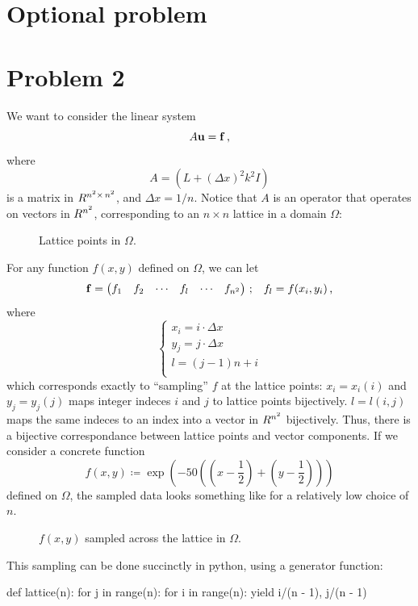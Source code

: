 \documentclass[12pt]{article}
\begin{document}
\begin{multicols}{2}
    \section*{Optional problem}



    \section*{Problem 2}
    We want to consider the linear system
    \[
        A \vec u = \vec f \,\text,
    \]
    where
    \[
        A = \left(
            L + (\Delta x)^2 k^2 I
        \right)
    \]
    is a matrix in $\R^{{n^2} \times\, {n^2}}$,
    and $\Delta x = 1/n$. Notice that $A$ is an operator
    that operates on vectors in $\R^{n^2}$, corresponding to
    an $n \times n$ lattice in a domain $\Omega$:

    \begin{figure}[H]
        \centering
        
        \caption{
            Lattice points in $\Omega$.
        }
        \label{fig:omega}
    \end{figure}\noindent
    For any function $f(x, y)$ defined on $\Omega$, we can let
    \[
        \vec f = \begin{pmatrix}
            f_1 & f_2 & \cdots & f_l & \cdots & f_{n^2}
        \end{pmatrix}
        \,\text; \quad
        f_l = f(x_i, y_i) \,\text,
    \]
    where
    \[
        \left\{\begin{array}{l}
            x_i = i \cdot \Delta x \\
            y_j = j \cdot \Delta x \\
            l = \left(j - 1\right)n + i \\
        \end{array}\right.
    \]
    which corresponds exactly to ``sampling'' $f$ at the lattice points:
    $x_i = x_i(i)$ and $y_j = y_j(j)$ maps integer indeces $i$ and $j$
    to lattice points bijectively.
    $l = l(i,j)$ maps the same indeces to an index into a vector in $\R^{n^2}$
    bijectively.
    Thus, there is a bijective correspondance between lattice points
    and vector components.
    If we consider a concrete function
    \[
        f(x, y) \coloneqq \exp{\left(
            -50 \left(
                \left(x - \frac{1}{2}\right)
                + \left(y - \frac{1}{2}\right)
            \right)
        \right)}
    \]
    defined on $\Omega$, the sampled data looks something like
     for a relatively low choice of $n$.
    \begin{figure}[H]
        \centering
        
        \caption{
            $f(x, y)$ sampled across the lattice in $\Omega$.
        }
        \label{fig:sample}
    \end{figure}\noindent
    This sampling can be done succinctly in python, using
    a generator function:
    \begin{python}[
        caption={Program to sample functions over lattices}
    ]
def lattice(n):
    for j in range(n):
        for i in range(n):
            yield i/(n - 1), j/(n - 1)


\end{python}
\end{multicols}
\end{document}

